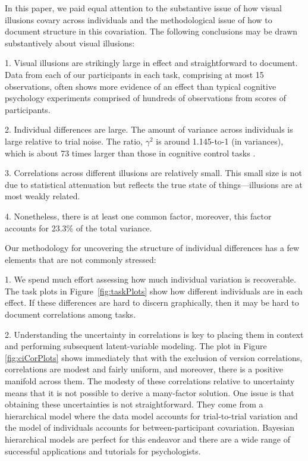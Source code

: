 
In this paper, we paid equal attention to the substantive issue of how visual illusions covary across individuals and the methodological issue of how to document structure in this covariation.  The following conclusions may be drawn substantively about visual illusions:  

1. Visual illusions are strikingly large in effect and straightforward to document.  Data from each of our participants in each task, comprising at most 15 observations, often shows more evidence of an effect than typical cognitive psychology experiments comprised of hundreds of observations from scores of participants.  

2.  Individual differences are large.  The amount of variance across individuals is large relative to trial noise.  The ratio, $\gamma^2$ is around 1.145-to-1 (in variances), which is about 73 times larger than those in cognitive control tasks \parencite[]{Rouder.etal.2024}.  

3. Correlations across different illusions are relatively small.  This small size is not due to statistical attenuation but reflects the true state of things---illusions are at most weakly related.  

4. Nonetheless, there is at least one common factor, moreover, this factor accounts for 23.3\% of the total variance.

Our methodology for uncovering the structure of individual differences has a few elements that are not commonly stressed: 

1. We spend much effort assessing how much individual variation is recoverable.  The task plots in Figure~\ref{fig:taskPlots} show how different individuals are in each effect.  If these differences are hard to discern graphically, then it may be hard to document correlations among tasks.

2. Understanding the uncertainty in correlations is key to placing them in context and performing subsequent latent-variable modeling.  The plot in Figure \ref{fig:ciCorPlots} shows immediately that with the exclusion of version correlations, correlations are modest and fairly uniform, and moreover, there is a positive manifold across them.   The modesty of these correlations relative to uncertainty means that it is not possible to derive a many-factor solution.  One issue is that obtaining these uncertainties is not straightforward.  They come from a hierarchical model where the data model accounts for trial-to-trial variation and the model of individuals accounts for between-participant covariation.  Bayesian hierarchical models are perfect for this endeavor and there are a wide range of successful applications and tutorials for psychologists. 

